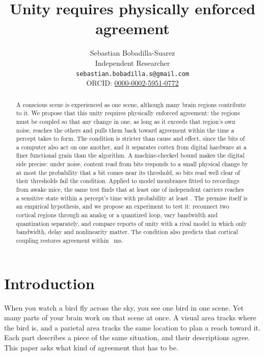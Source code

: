 \documentclass[12pt]{article}
\title{Unity requires physically enforced agreement}
\author{Sebastian Bobadilla-Suarez\\
Independent Researcher\\
\texttt{sebastian.bobadilla.s@gmail.com}\\
ORCID: \href{https://orcid.org/0000-0002-5951-0772}{0000-0002-5951-0772}}
\date{}
\begin{document}
\maketitle

\begin{abstract}
A conscious scene is experienced as one scene, although many brain regions
contribute to it. We propose that this unity requires physically enforced
agreement: the regions must be coupled so that any change in one, as long as it
exceeds that region's own noise, reaches the others and pulls them back toward
agreement within the time a percept takes to form. The condition is stricter
than cause and effect, since the bits of a computer also act on one another,
and it separates cortex from digital hardware at a finer functional grain than
the algorithm. A machine-checked bound makes the digital side precise: under
noise, content read from bits responds to a small physical change by at most
the probability that a bit comes near its threshold, so bits read well clear of
their thresholds fail the condition. Applied to model membranes fitted to
recordings from awake mice, the same test finds that at least one of
\uOccCarriersFew{} independent carriers reaches a sensitive state within a
percept's time with probability at least \uRecLinkFewLong{}. The premise itself
is an empirical hypothesis, and we propose an experiment to test it: reconnect
two cortical regions through an analog or a quantized loop, vary bandwidth and
quantization separately, and compare reports of unity with a rival model in
which only bandwidth, delay and nonlinearity matter. The condition also
predicts that cortical coupling restores agreement within \ueTauFastMs{}~ms.
\end{abstract}

\section{Introduction}
\label{sec:intro}

When you watch a bird fly across the sky, you see one bird in one scene. Yet
many parts of your brain work on that scene at once. A visual area tracks where
the bird is, and a parietal area tracks the same location to plan a reach
toward it. Each part describes a piece of the same situation, and their
descriptions agree. This paper asks what kind of agreement that has to be.
\end{document}
